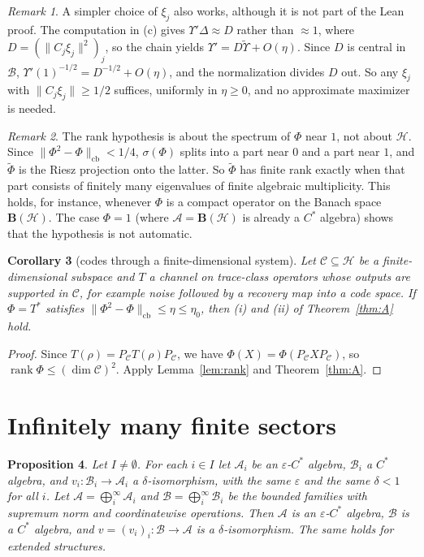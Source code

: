 \documentclass[11pt]{article}
\newtheorem{proposition}{Proposition}[section]
\newtheorem{corollary}[proposition]{Corollary}
\theoremstyle{remark}
\newtheorem{remark}[proposition]{Remark}
\newcommand{\eps}{\varepsilon}
\newcommand{\cA}{\mathcal{A}}
\newcommand{\cB}{\mathcal{B}}
\newcommand{\cH}{\mathcal{H}}
\newcommand{\Bo}{\mathbf{B}}
\newcommand{\cb}{\mathrm{cb}}
\newcommand{\wt}{\widetilde}
\begin{document}
\begin{remark}
A simpler choice of $\xi_j$ also works, although it is not part of the Lean proof. The computation in (c) gives $\Upsilon'\Delta\approx D$ rather than $\approx1$, where $D=(\|C_j\xi_j\|^2)_j$, so the chain yields $\Upsilon'=D\wt\Upsilon+O(\eta)$. Since $D$ is central in $\cB$, $\Upsilon'(1)^{-1/2}=D^{-1/2}+O(\eta)$, and the normalization divides $D$ out. So any $\xi_j$ with $\|C_j\xi_j\|\ge1/2$ suffices, uniformly in $\eta\ge0$, and no approximate maximizer is needed.
\end{remark}

\begin{remark}
The rank hypothesis is about the spectrum of $\Phi$ near $1$, not about $\cH$. Since $\|\Phi^2-\Phi\|_\cb<1/4$, $\sigma(\Phi)$ splits into a part near $0$ and a part near $1$, and $\wt\Phi$ is the Riesz projection onto the latter. So $\wt\Phi$ has finite rank exactly when that part consists of finitely many eigenvalues of finite algebraic multiplicity. This holds, for instance, whenever $\Phi$ is a compact operator on the Banach space $\Bo(\cH)$. The case $\Phi=1$ (where $\cA=\Bo(\cH)$ is already a $C^*$ algebra) shows that the hypothesis is not automatic.
\end{remark}

\begin{corollary}[codes through a finite-dimensional system]\label{cor:codes}
Let $\mathcal{C}\subseteq\cH$ be a finite-dimensional subspace and $T$ a channel on trace-class operators whose outputs are supported in $\mathcal{C}$, for example noise followed by a recovery map into a code space. If $\Phi=T^*$ satisfies $\|\Phi^2-\Phi\|_\cb\le\eta\le\eta_0$, then (i) and (ii) of Theorem~\ref{thm:A} hold.
\end{corollary}

\begin{proof}
Since $T(\rho)=P_\mathcal{C}T(\rho)P_\mathcal{C}$, we have $\Phi(X)=\Phi(P_\mathcal{C}XP_\mathcal{C})$, so $\operatorname{rank}\Phi\le(\dim\mathcal{C})^2$. Apply Lemma~\ref{lem:rank} and Theorem~\ref{thm:A}.
\end{proof}

\section{Infinitely many finite sectors}

\begin{proposition}\label{prop:sum}
Let $I\neq\emptyset$. For each $i\in I$ let $\cA_i$ be an $\eps$-$C^*$ algebra, $\cB_i$ a $C^*$ algebra, and $v_i\colon\cB_i\to\cA_i$ a $\delta$-isomorphism, with the same $\eps$ and the same $\delta<1$ for all $i$. Let $\cA=\bigoplus^\infty_i\cA_i$ and $\cB=\bigoplus^\infty_i\cB_i$ be the bounded families with supremum norm and coordinatewise operations. Then $\cA$ is an $\eps$-$C^*$ algebra, $\cB$ is a $C^*$ algebra, and $v=(v_i)_i\colon\cB\to\cA$ is a $\delta$-isomorphism. The same holds for extended structures.
\end{proposition}
\end{document}
